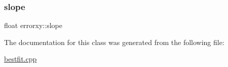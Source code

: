 \mbox{\label{classerrorxy_a78038a0cf07f5680a7b48a0bfb6883d3}} 
\subsubsection{\texorpdfstring{slope}{slope}}
{\footnotesize\ttfamily float errorxy\+::slope}



The documentation for this class was generated from the following file\+:\begin{DoxyCompactItemize}
\item 
\hyperlink{bestfit_8cpp}{bestfit.\+cpp}\end{DoxyCompactItemize}
